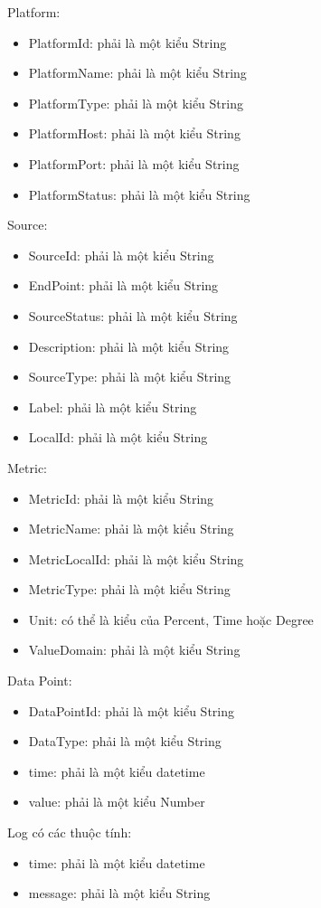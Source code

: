 \hspace{0mm}Platform:
\begin{itemize}
	\item PlatformId: phải là một kiểu String
	\item PlatformName: phải là một kiểu String
	\item PlatformType: phải là một kiểu String
	\item PlatformHost: phải là một kiểu String
	\item PlatformPort: phải là một kiểu String
	\item PlatformStatus: phải là một kiểu String
\end{itemize}
\hspace{0mm}Source:
\begin{itemize}
	\item SourceId: phải là một kiểu String
	\item EndPoint: phải là một kiểu String
	\item SourceStatus: phải là một kiểu String
	\item Description: phải là một kiểu String
	\item SourceType: phải là một kiểu String
	\item Label: phải là một kiểu String
	\item LocalId: phải là một kiểu String
\end{itemize}
\hspace{0mm}Metric:
\begin{itemize}
	\item MetricId: phải là một kiểu String
	\item MetricName: phải là một kiểu String
	\item MetricLocalId: phải là một kiểu String
	\item MetricType: phải là một kiểu String
	\item Unit: có thể là kiểu của Percent, Time hoặc Degree
	\item ValueDomain: phải là một kiểu String
\end{itemize}
\hspace{0mm}Data Point:
\begin{itemize}
	\item DataPointId: phải là một kiểu String
	\item DataType: phải là một kiểu String
	\item time: phải là một kiểu datetime
	\item value: phải là một kiểu Number
\end{itemize}
\hspace{0mm}Log có các thuộc tính:
\begin{itemize}
	\item time: phải là một kiểu datetime
	\item message: phải là một kiểu String
\end{itemize}

